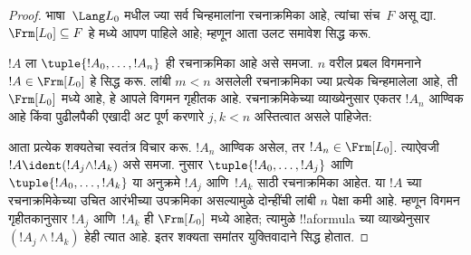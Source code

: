 \documentclass[../../../include/open-logic-section]{subfiles}
\begin{document}
\begin{proof}
भाषा~$\Lang L_0$ मधील ज्या सर्व चिन्हमालांना रचनाक्रमिका आहे, त्यांचा
संच~$F$ असू द्या. $\Frm[L_0] \subseteq F$ हे
 मध्ये आपण पाहिले आहे; म्हणून आता उलट
समावेश सिद्ध करू.

$!A$ ला $\tuple{!A_0,\dotsc,!A_n}$ ही रचनाक्रमिका आहे असे समजा.
$n$ वरील प्रबल विगमनाने $!A \in \Frm[L_0]$ हे सिद्ध करू. लांबी
$m < n$ असलेली रचनाक्रमिका ज्या प्रत्येक चिन्हमालेला आहे, ती
$\Frm[L_0]$ मध्ये आहे, हे आपले विगमन गृहीतक आहे. रचनाक्रमिकेच्या
व्याख्येनुसार एकतर $!A_n$ आण्विक आहे किंवा पुढीलपैकी एखादी अट पूर्ण
करणारे $j,k < n$ अस्तित्वात असले पाहिजेत:
\begin{enumerate}
\end{enumerate}
आता प्रत्येक शक्यतेचा स्वतंत्र विचार करू. $!A_n$ आण्विक असेल, तर
$!A_n \in \Frm[L_0]$. त्याऐवजी $!A \ident
(!A_j \land !A_k)$ असे समजा.
 नुसार
$\tuple{!A_0,\dotsc,!A_j}$ आणि $\tuple{!A_0,\dotsc,!A_k}$ या अनुक्रमे
$!A_j$ आणि~$!A_k$ साठी रचनाक्रमिका आहेत. या $!A$ च्या
रचनाक्रमिकेच्या उचित आरंभीच्या उपक्रमिका असल्यामुळे दोन्हींची लांबी
$n$ पेक्षा कमी आहे. म्हणून विगमन गृहीतकानुसार $!A_j$ आणि~$!A_k$ ही
$\Frm[L_0]$ मध्ये आहेत; त्यामुळे !!a{formula} च्या व्याख्येनुसार
$(!A_j \land !A_k)$ हेही त्यात आहे. इतर शक्यता समांतर युक्तिवादाने
सिद्ध होतात.
\end{proof}
\end{document}
